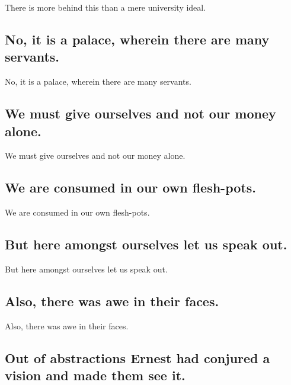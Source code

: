 \documentclass[]{article}
\begin{document}
There is more behind this than a mere university ideal.

\hypertarget{no-it-is-a-palace-wherein-there-are-many-servants.}{%
\subsection{No, it is a palace, wherein there are many
servants.}\label{no-it-is-a-palace-wherein-there-are-many-servants.}}

No, it is a palace, wherein there are many servants.

\hypertarget{we-must-give-ourselves-and-not-our-money-alone.}{%
\subsection{We must give ourselves and not our money
alone.}\label{we-must-give-ourselves-and-not-our-money-alone.}}

We must give ourselves and not our money alone.

\hypertarget{we-are-consumed-in-our-own-flesh-pots.}{%
\subsection{We are consumed in our own
flesh-pots.}\label{we-are-consumed-in-our-own-flesh-pots.}}

We are consumed in our own flesh-pots.

\hypertarget{but-here-amongst-ourselves-let-us-speak-out.}{%
\subsection{But here amongst ourselves let us speak
out.}\label{but-here-amongst-ourselves-let-us-speak-out.}}

But here amongst ourselves let us speak out.

\hypertarget{also-there-was-awe-in-their-faces.}{%
\subsection{Also, there was awe in their
faces.}\label{also-there-was-awe-in-their-faces.}}

Also, there was awe in their faces.

\hypertarget{out-of-abstractions-ernest-had-conjured-a-vision-and-made-them-see-it.}{%
\subsection{Out of abstractions Ernest had conjured a vision and made
them see
it.}\label{out-of-abstractions-ernest-had-conjured-a-vision-and-made-them-see-it.}}
\end{document}
